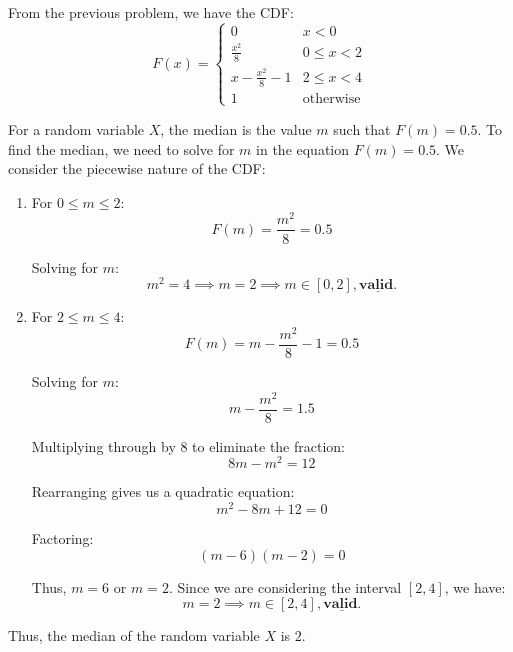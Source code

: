\documentclass[a4paper, 10pt]{article}
\begin{document}
\begin{solution}
	From the previous problem, we have the CDF:
	\[
		F(x) = \begin{cases}
			0                     & x < 0            \\
			\frac{x^2}{8}         & 0 \leq x < 2     \\
			x - \frac{x^2}{8} - 1 & 2 \leq x < 4     \\
			1                     & \text{otherwise}
		\end{cases}
	\]

	For a random variable \( X \), the median is the value \( m \) such that \( F(m) = 0.5 \).
	To find the median, we need to solve for \( m \) in the equation \( F(m) = 0.5 \).
	We consider the piecewise nature of the CDF:
	\begin{enumerate}
		\item For \( 0 \leq m \leq 2 \):
		      \[
			      F(m) = \frac{m^2}{8} = 0.5
		      \]

		      Solving for \( m \):
		      \[
			      m^2 = 4 \implies m = 2 \implies m \in [0, 2], \underline{\textbf{valid.}}
		      \]

		\item For \( 2 \leq m \leq 4 \):
		      \[
			      F(m) = m - \frac{m^2}{8} - 1 = 0.5
		      \]

		      Solving for \( m \):
		      \[
			      m - \frac{m^2}{8} = 1.5
		      \]

		      Multiplying through by 8 to eliminate the fraction:
		      \[
			      8m - m^2 = 12
		      \]

		      Rearranging gives us a quadratic equation:
		      \[
			      m^2 - 8m + 12 = 0
		      \]

		      Factoring:
		      \[
			      (m - 6)(m - 2) = 0
		      \]

		      Thus, \( m = 6 \) or \( m = 2 \). Since we are considering the interval \( [2, 4] \), we have:
		      \[
			      m = 2 \implies m \in [2, 4], \underline{\textbf{valid.}}
		      \]
	\end{enumerate}

	Thus, the median of the random variable \( X \) is \( \boxed{2} \).
\end{solution}

\newpage
\end{document}
